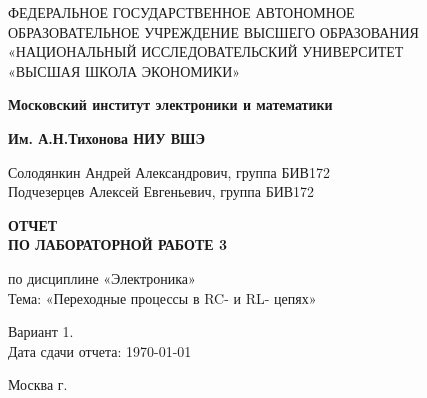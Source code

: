 \begin{titlepage}
	\begin{center}
		ФЕДЕРАЛЬНОЕ  ГОСУДАРСТВЕННОЕ АВТОНОМНОЕ \\
		ОБРАЗОВАТЕЛЬНОЕ УЧРЕЖДЕНИЕ ВЫСШЕГО ОБРАЗОВАНИЯ\\
		«НАЦИОНАЛЬНЫЙ ИССЛЕДОВАТЕЛЬСКИЙ УНИВЕРСИТЕТ\\
		«ВЫСШАЯ ШКОЛА ЭКОНОМИКИ»
	\end{center}
	
	\begin{center}
		\textbf{Московский институт электроники и математики}
		
		\textbf{Им. А.Н.Тихонова НИУ ВШЭ}
	\end{center}
	\vspace{1ex}	
	\begin{center}
		Солодянкин Андрей Александрович, группа БИВ172\\
		Подчезерцев Алексей Евгеньевич, группа БИВ172
	\end{center}	
	\vspace{1ex}
	\begin{center}
		\textbf{ОТЧЕТ\\
		ПО ЛАБОРАТОРНОЙ РАБОТЕ 3
	}
	\end{center}	
	\vspace{2ex}
	\begin{center}
		по дисциплине «Электроника»\\
		Тема: «Переходные процессы в RC- и RL- цепях»
	\end{center}
	\vspace{2ex}
	\begin{center}
	Вариант 1.\\
	Дата сдачи отчета: \today
	\end{center}
	\vspace{2ex}
	\vfill
	\begin{center}
		Москва \the\year г.
	\end{center}
\end{titlepage}